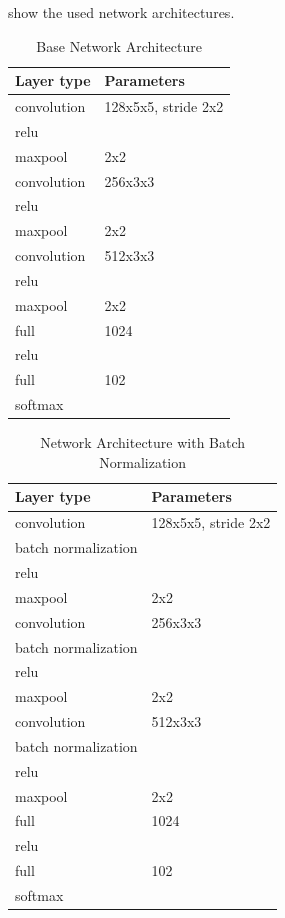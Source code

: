 \documentclass[a4paper, 11pt]{article}
\begin{document}
 show the used network architectures.

\begin{table}[H]
	\begin{center}
		\begin{tabularx}{.5\linewidth}{|X|l|}
			\hline \textbf{Layer type} & \textbf{Parameters} \\ 
			\hline convolution & 128x5x5, stride 2x2 \\ 
			\hline relu &\\
			\hline maxpool &  2x2\\ 
			\hline convolution & 256x3x3 \\ 
			\hline relu &\\
			\hline maxpool &  2x2\\ 
			\hline convolution & 512x3x3 \\ 
			\hline relu &\\
			\hline maxpool &  2x2\\ 
			\hline full &  1024 \\ 
			\hline relu &\\
			\hline full &  102 \\
			\hline softmax & \\
			\hline
		\end{tabularx}
	\end{center}
	\caption{Base Network Architecture}
	\label{tab:base-arch}
\end{table}


\begin{table}[H]
	\begin{center}
		\begin{tabularx}{.5\linewidth}{|X|l|}
			\hline \textbf{Layer type} & \textbf{Parameters} \\ 
			\hline convolution & 128x5x5, stride 2x2 \\ 
			\hline batch normalization & \\
			\hline relu &\\
			\hline maxpool &  2x2\\ 
			\hline convolution & 256x3x3 \\ 
			\hline batch normalization & \\
			\hline relu &\\
			\hline maxpool &  2x2\\ 
			\hline convolution & 512x3x3 \\ 
			\hline batch normalization & \\
			\hline relu &\\
			\hline maxpool &  2x2\\ 
			\hline full &  1024 \\ 
			\hline relu &\\
			\hline full &  102 \\
			\hline softmax & \\
			\hline
		\end{tabularx}
	\end{center}
	\caption{Network Architecture with Batch Normalization}
	\label{tab:bn-arch}
\end{table}
\end{document}
